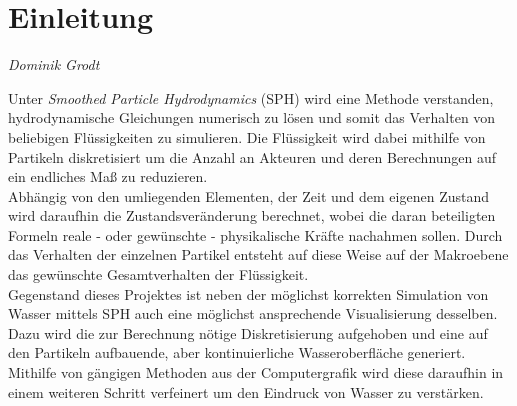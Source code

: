\chapter*{Einleitung}
\thispagestyle{empty}

\begin{center}
\emph{{\small Dominik Grodt}}
\end{center}

\bigskip

Unter \textit{Smoothed Particle Hydrodynamics} (SPH) wird eine Methode verstanden, hydrodynamische Gleichungen numerisch zu lösen und somit das Verhalten von beliebigen Flüssigkeiten zu simulieren. Die Flüssigkeit wird dabei mithilfe von Partikeln diskretisiert um die Anzahl an Akteuren und deren Berechnungen auf ein endliches Maß zu reduzieren.\\
Abhängig von den umliegenden Elementen, der Zeit und dem eigenen Zustand wird daraufhin die Zustandsveränderung berechnet, wobei die daran beteiligten Formeln reale - oder gewünschte - physikalische Kräfte nachahmen sollen. Durch das Verhalten der einzelnen Partikel entsteht auf diese Weise auf der Makroebene das gewünschte Gesamtverhalten der Flüssigkeit. \\
Gegenstand dieses Projektes ist neben der möglichst korrekten Simulation von Wasser mittels SPH auch eine möglichst ansprechende Visualisierung desselben. Dazu wird die zur Berechnung nötige Diskretisierung aufgehoben und eine auf den Partikeln aufbauende, aber kontinuierliche Wasseroberfläche generiert. Mithilfe von gängigen Methoden aus der Computergrafik wird diese daraufhin in einem weiteren Schritt verfeinert um den Eindruck von Wasser zu verstärken.